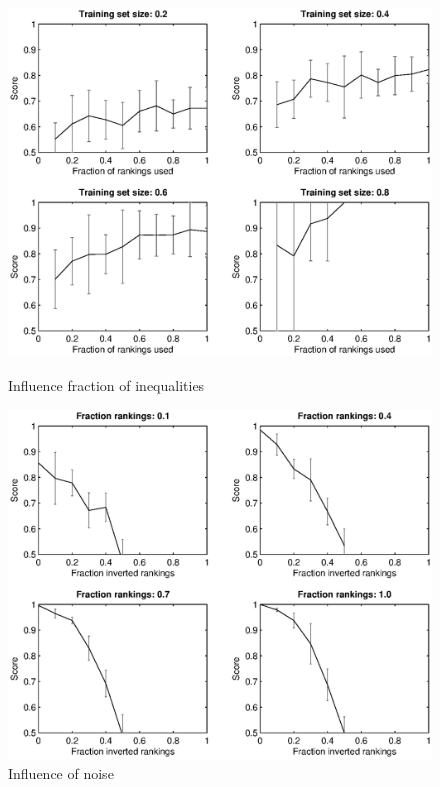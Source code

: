 \documentclass[letterpaper]{article}
\theoremstyle{definition}
\begin{document}
\begin{figure}
  \begin{minipage}{0.5\textwidth}

  \centering
    \includegraphics[width=1.1\linewidth]{rankings}
  \caption{Influence fraction of inequalities}
  \label{fig:fractie}

  \end{minipage}
  \begin{minipage}{0.5\textwidth}

      \centering
        \includegraphics[width=1.1\linewidth]{noise}
      \caption{Influence of noise}
      \label{fig:ruis}

  \end{minipage}
    \end{figure}
\end{document}
